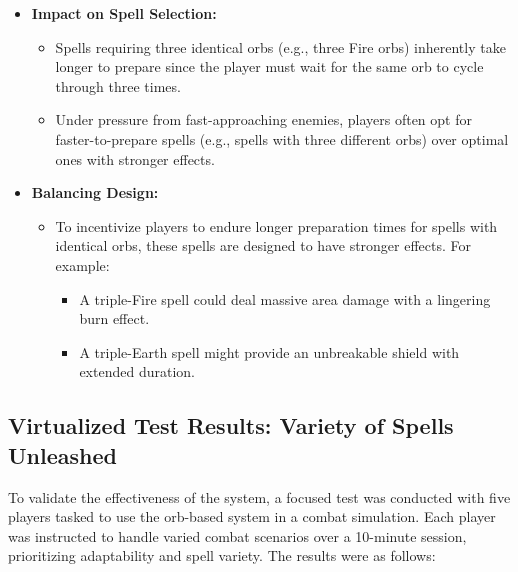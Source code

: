 \documentclass[10pt,twocolumn]{article}
\begin{document}
\begin{itemize}
    \item \textbf{Impact on Spell Selection:}
    \begin{itemize}
        \item Spells requiring three identical orbs (e.g., three Fire orbs) inherently take longer to prepare since the player must wait for the same orb to cycle through three times.
        \item Under pressure from fast-approaching enemies, players often opt for faster-to-prepare spells (e.g., spells with three different orbs) over optimal ones with stronger effects.
    \end{itemize}
    \item \textbf{Balancing Design:}
    \begin{itemize}
        \item To incentivize players to endure longer preparation times for spells with identical orbs, these spells are designed to have stronger effects. For example:
        \begin{itemize}
            \item A triple-Fire spell could deal massive area damage with a lingering burn effect.
            \item A triple-Earth spell might provide an unbreakable shield with extended duration.
        \end{itemize}
    \end{itemize}
\end{itemize}

\subsection{Virtualized Test Results: Variety of Spells Unleashed}
To validate the effectiveness of the system, a focused test was conducted with five players tasked to use the orb-based system in a combat simulation. Each player was instructed to handle varied combat scenarios over a 10-minute session, prioritizing adaptability and spell variety. The results were as follows:
\end{document}
